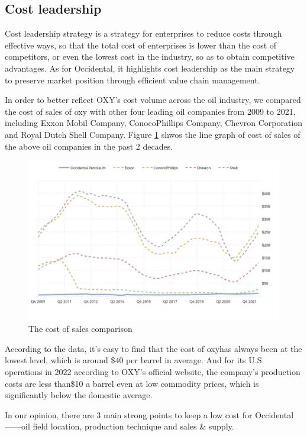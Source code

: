 \documentclass[
	a4paper, %
	12pt,%
]{CSSullivanBusinessReport}
\begin{document}
\begin{fullwidth}
\subsection{Cost leadership}
Cost leadership strategy is a strategy for enterprises to reduce costs through effective ways, so that the total cost of enterprises is lower than the cost of competitors, or even the lowest cost in the industry, so as to obtain competitive advantages. As for Occidental, it highlights cost leadership as the main strategy to preserve market position through efficient value chain management.
\par
In order to better reflect OXY's cost volume across the oil industry, we compared the cost of sales of oxy with other four leading oil companies from 2009 to 2021, including Exxon Mobil Company, ConocoPhillips Company, Chevron Corporation and Royal Dutch Shell Company. Figure \ref{COGS} shwos the line graph of cost of sales of the above oil companies in the past 2 decades.
\par
\begin{figure}[h]
    \centering
    \includegraphics{Images/COGS.png}
    \caption{The cost of sales comparison}
    \label{COGS}
\end{figure}
 According to the data, it's easy to find that the cost of oxyhas always been at the lowest level, which is around \$40 per barrel in average. And for its U.S. operations in 2022 according to OXY’s official website, the company's production costs are less than\$10 a barrel even at low commodity prices, which is significantly below the domestic average.
 \par
In our opinion, there are 3 main strong points to keep a low cost for Occidental——oil field location, production technique and sales \& supply.

\end{fullwidth}
\end{document}

